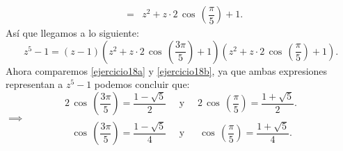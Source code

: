 \documentclass[twoside]{book}
\renewcommand{\cos}{\,\operatorname{cos}\,}
\begin{document}
\begin{sol}
\begin{solucion}{}
\begin{eqnarray*}
            &=&z^2+z\cdot2\cos\left(\dfrac{\pi}{5}\right)+1.
        \end{eqnarray*}
        As\'i que llegamos a lo siguiente:
        \begin{equation}\label{ejercicio18b}
            z^5-1=(z-1)\left(z^2+z\cdot2\cos\left(\dfrac{3\pi}{5}\right)+1\right)\left(z^2+z\cdot2\cos\left(\dfrac{\pi}{5}\right)+1\right).
        \end{equation}
        Ahora comparemos \eqref{ejercicio18a} y \eqref{ejercicio18b}, ya que ambas expresiones representan a $z^5-1$ podemos concluir que:
        $$2\cos\left(\dfrac{3\pi}{5}\right)=\dfrac{1-\sqrt{5}}{2}\quad  \text{ y }\quad 2\cos\left(\dfrac{\pi}{5}\right)=\dfrac{1+\sqrt{5}}{2}.$$
        $\implies$
        $$\cos\left(\dfrac{3\pi}{5}\right)=\dfrac{1-\sqrt{5}}{4}\quad  \text{ y }\quad \cos\left(\dfrac{\pi}{5}\right)=\dfrac{1+\sqrt{5}}{4}.$$

    \end{solucion}
\end{sol}
\end{document}

